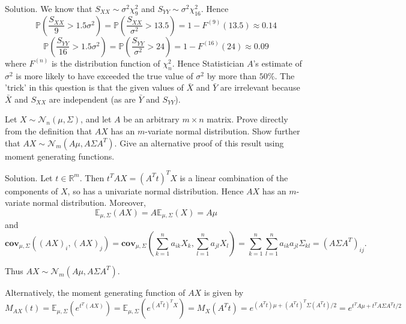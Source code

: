 Solution. We know that $S_{XX}\sim\sigma^2\chi_9^2$ and $S_{YY}\sim\sigma^2\chi_{16}^2$. Hence
\begin{equation}
\mathbb{P}\left(\frac{S_{XX}}{9}>1.5\sigma^2\right) = \mathbb{P}\left(\frac{S_{XX}}{\sigma^2}>13.5\right) = 1 - F^{(9)}(13.5)\approx 0.14
\end{equation}
\begin{equation}
\mathbb{P}\left(\frac{S_{YY}}{16}>1.5\sigma^2\right) = \mathbb{P}\left(\frac{S_{YY}}{\sigma^2}>24\right) = 1 - F^{(16)}(24)\approx 0.09
\end{equation}
where $F^{(n)}$ is the distribution function of $\chi_n^2$. Hence Statistician $A$'s estimate of $\sigma^2$ is more likely to have exceeded the true value of $\sigma^2$ by more than $50\%$. The 'trick' in this question is that the given values of $\bar{X}$ and $\bar{Y}$ are irrelevant because $\bar{X}$ and $S_{XX}$ are independent (as are $\bar{Y}$ and $S_{YY}$).



\item Let $X\sim \mathcal{N}_n(\mu,\Sigma)$, and let $A$ be an arbitrary $m\times n$ matrix. Prove directly from the definition that $AX$ has an $m$-variate normal distribution. Show further that $AX\sim \mathcal{N}_m(A\mu,A\Sigma A^T)$. Give an alternative proof of this result using moment generating functions.



Solution. Let $t\in\mathbb{R}^m$. Then $t^TAX=(A^Tt)^TX$ is a linear combination of the components of $X$, so has a univariate normal distribution. Hence $AX$ has an $m$-variate normal distribution. Moreover,
\begin{equation}
\mathbb{E}_{\mu,\Sigma}(AX) = A\mathbb{E}_{\mu,\Sigma}(X) = A\mu
\end{equation}
and
\begin{equation}
\mathbf{cov}_{\mu,\Sigma}((AX)_i,(AX)_j) = \mathbf{cov}_{\mu,\Sigma}\left(\sum^n_{k=1}a_{ik}X_k,\sum^n_{l=1}a_{jl}X_l\right) = \sum^n_{k=1}\sum^n_{l=1}a_{ik}a_{jl}\Sigma_{kl} = (A\Sigma A^T)_{ij}.
\end{equation}

Thus $AX\sim \mathcal{N}_m(A\mu,A\Sigma A^T)$.

Alternatively, the moment generating function of $AX$ is given by
\begin{equation}
M_{AX}(t) = \mathbb{E}_{\mu,\Sigma}\left(e^{t^T(AX)}\right) = \mathbb{E}_{\mu,\Sigma}\left(e^{(A^Tt)^TX}\right) = M_X(A^Tt) = e^{(A^Tt)\mu + (A^Tt)^T\Sigma(A^Tt)/2} = e^{t^TA\mu + t^TA\Sigma A^Tt/2}
\end{equation}

